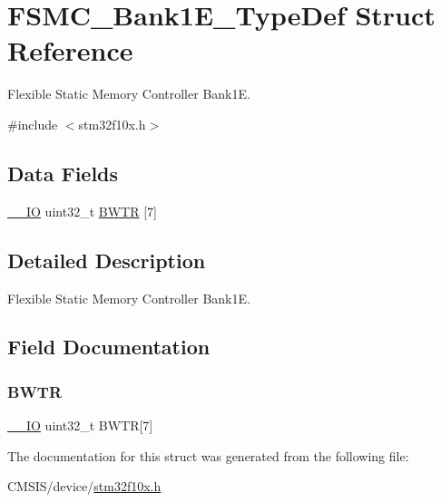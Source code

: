 \hypertarget{struct_f_s_m_c___bank1_e___type_def}{}\section{F\+S\+M\+C\+\_\+\+Bank1\+E\+\_\+\+Type\+Def Struct Reference}
\label{struct_f_s_m_c___bank1_e___type_def}


Flexible Static Memory Controller Bank1E.  




{\ttfamily \#include $<$stm32f10x.\+h$>$}

\subsection*{Data Fields}
\begin{DoxyCompactItemize}
\item 
\mbox{\hyperlink{core__sc300_8h_aec43007d9998a0a0e01faede4133d6be}{\+\_\+\+\_\+\+IO}} uint32\+\_\+t \mbox{\hyperlink{struct_f_s_m_c___bank1_e___type_def_a20f13b79c0f8670af319af0c5ebd5c91}{B\+W\+TR}} \mbox{[}7\mbox{]}
\end{DoxyCompactItemize}


\subsection{Detailed Description}
Flexible Static Memory Controller Bank1E. 

\subsection{Field Documentation}
\mbox{\label{struct_f_s_m_c___bank1_e___type_def_a20f13b79c0f8670af319af0c5ebd5c91}} 
\subsubsection{\texorpdfstring{BWTR}{BWTR}}
{\footnotesize\ttfamily \mbox{\hyperlink{core__sc300_8h_aec43007d9998a0a0e01faede4133d6be}{\+\_\+\+\_\+\+IO}} uint32\+\_\+t B\+W\+TR\mbox{[}7\mbox{]}}



The documentation for this struct was generated from the following file\+:\begin{DoxyCompactItemize}
\item 
C\+M\+S\+I\+S/device/\mbox{\hyperlink{stm32f10x_8h}{stm32f10x.\+h}}\end{DoxyCompactItemize}
